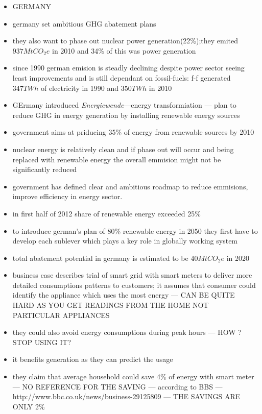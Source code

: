 \documentclass[11pt, twocolumn]{article}
\begin{document}
\begin{itemize}
\item GERMANY
\item germany set ambitious GHG abatement plans
\item they also want to phase out nuclear power generation(22\%);they emited $937 MtCO_2e$ in 2010 and 34\% of this was power generation
\item since 1990 german emision is steadly declining despite power sector seeing least improvements and is still dependant on fossil-fuels: f-f generated $347 TWh$ of electricity in 1990 and $350 TWh$ in 2010
\item GErmany introduced \emph{Energiewende}---energy transformiation --- plan to reduce GHG in energy generation by installing renewable energy sources
\item government aims at priducing 35\% of energy from renewable sources by 2010
\item nuclear energy is relatively clean and if phase out will occur and being replaced with renewable energy the overall emmision might not be significantly reduced
\item government has defined clear and ambitious roadmap to reduce emmisions, improve efficiency in energy sector.
\item in first half of 2012 share of renewable energy exceeded 25\%
\item to introduce german's plan of 80\% renewable energy in 2050 they first have to develop each sublever which plays a key role in globally working system
\item total abatement potential in germany is estimated to be $40 MtCO_2e$ in 2020

\item business case describes trial of smart grid with smart meters to deliver more detailed consumptions patterns to customers; it assumes that consumer could identify the appliance which uses the most energy --- CAN BE QUITE HARD AS YOU GET READINGS FROM THE HOME NOT PARTICULAR APPLIANCES
\item they could also avoid energy consumptions during peak hours --- HOW ? STOP USING IT?
\item it benefits generation as they can predict the usage
\item they claim that average household could save 4\% of energy with smart meter --- NO REFERENCE FOR THE SAVING --- according to BBS --- http://www.bbc.co.uk/news/business-29125809 --- THE SAVINGS ARE ONLY 2\%



\end{itemize}
\end{document}
